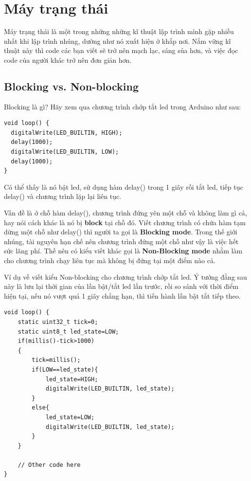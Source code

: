 \chapter{Máy trạng thái}

Máy trạng thái là một trong những những kĩ thuật lập trình mình gặp nhiều nhất khi lập trình nhúng, dường như nó xuất hiện ở khắp nơi. Nắm vững kĩ thuật này thì code các bạn viết sẽ trở nên mạch lạc, sáng sủa hơn, và việc đọc code của người khác trở nên đơn giản hơn.
\newpage

\section{Blocking vs. Non-blocking}

Blocking là gì? Hãy xem qua chương trình chớp tắt led trong Arduino như sau:
\begin{lstlisting}
void loop() {
  digitalWrite(LED_BUILTIN, HIGH);   
  delay(1000);                       
  digitalWrite(LED_BUILTIN, LOW);    
  delay(1000);                       
}
\end{lstlisting}

Có thể thấy là nó bật led, sử dụng hàm delay() trong 1 giây rồi tắt led, tiếp tục delay() và chương trình lặp lại liên tục.

Vấn đề là ở chỗ hàm delay(), chương trình đứng yên một chỗ và không làm gì cả, hay nói cách khác là nó bị \textbf{block} tại chỗ đó. Viết chương trình có chứa hàm tạm dừng một chỗ như delay() thì người ta gọi là \textbf{Blocking mode}. Trong thế giới nhúng, tài nguyên hạn chế nên chương trình đứng một chỗ như vậy là việc hết sức lãng phí. Thế nên có kiểu viết khác gọi là \textbf{Non-Blocking mode} nhằm làm cho chương trình chạy liên tục mà không bị đứng tại một điểm nào cả.

Ví dụ về viết kiểu Non-blocking cho chương trình chớp tắt led. Ý tưởng đằng sau này là lưu lại thời gian của lần bật/tắt led lần trước, rồi so sánh với thời điểm hiện tại, nếu nó vượt quá 1 giây chẳng hạn, thì tiến hành lần bật tắt tiếp theo.\newline

\begin{lstlisting}
void loop() {
    static uint32_t tick=0;
    static uint8_t led_state=LOW;
    if(millis()-tick>1000)
    {
        tick=millis();
        if(LOW==led_state){
            led_state=HIGH;
            digitalWrite(LED_BUILTIN, led_state);
        }
        else{
            led_state=LOW;
            digitalWrite(LED_BUILTIN, led_state);
        }
    }

    // Other code here
}
\end{lstlisting}

